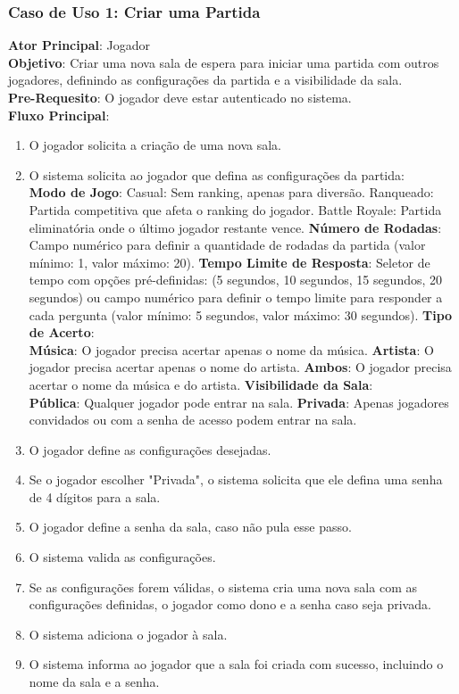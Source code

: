 \subsubsection{Caso de Uso 1: Criar uma Partida}
    \textbf{Ator Principal}: Jogador \\
    \textbf{Objetivo}: Criar uma nova sala de espera para iniciar uma partida com outros jogadores, definindo as configurações da partida e a visibilidade da sala. \\
    \textbf{Pre-Requesito}: O jogador deve estar autenticado no sistema. \\
    \textbf{Fluxo Principal}: \\
    \begin{enumerate}
        \item O jogador solicita a criação de uma nova sala.
        \item O sistema solicita ao jogador que defina as configurações da partida: \\
         \subitem \textbf{Modo de Jogo}: 
            \subsubitem Casual: Sem ranking, apenas para diversão. 
            \subsubitem Ranqueado: Partida competitiva que afeta o ranking do jogador. 
            \subsubitem Battle Royale: Partida eliminatória onde o último jogador restante vence.
        \subitem \textbf{Número de Rodadas}: Campo numérico para definir a quantidade de rodadas da partida (valor mínimo: 1, valor máximo: 20).
        \subitem \textbf{Tempo Limite de Resposta}: Seletor de tempo com opções pré-definidas: (5 segundos, 10 segundos, 15 segundos, 20 segundos) ou campo numérico para definir o tempo limite para responder a cada pergunta (valor mínimo: 5 segundos, valor máximo: 30 segundos).
        \subitem \textbf{Tipo de Acerto}: \\
            \subsubitem \textbf{Música}: O jogador precisa acertar apenas o nome da música.
            \subsubitem \textbf{Artista}: O jogador precisa acertar apenas o nome do artista.
            \subsubitem \textbf{Ambos}: O jogador precisa acertar o nome da música e do artista.
        \subitem \textbf{Visibilidade da Sala}: \\
            \subsubitem \textbf{Pública}: Qualquer jogador pode entrar na sala.
            \subsubitem \textbf{Privada}: Apenas jogadores convidados ou com a senha de acesso podem entrar na sala.
        \item O jogador define as configurações desejadas.
        \item Se o jogador escolher "Privada", o sistema solicita que ele defina uma senha de 4 dígitos para a sala.
        \item O jogador define a senha da sala, caso não pula esse passo.
        \item O sistema valida as configurações.
        \item Se as configurações forem válidas, o sistema cria uma nova sala com as configurações definidas, o jogador como dono e a senha caso seja privada.
        \item O sistema adiciona o jogador à sala.
        \item O sistema informa ao jogador que a sala foi criada com sucesso, incluindo o nome da sala e a senha.
    \end{enumerate}

